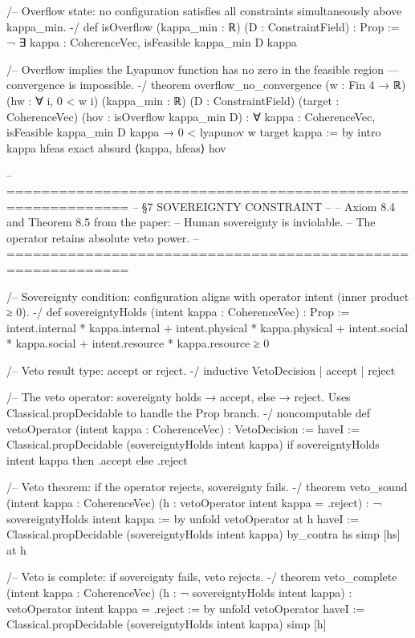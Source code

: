 /-- Overflow state: no configuration satisfies all constraints
    simultaneously above kappa_min. -/
def isOverflow (kappa_min : ℝ) (D : ConstraintField) : Prop :=
  ¬ ∃ kappa : CoherenceVec, isFeasible kappa_min D kappa

/-- Overflow implies the Lyapunov function has no zero
    in the feasible region — convergence is impossible. -/
theorem overflow_no_convergence (w : Fin 4 → ℝ) (hw : ∀ i, 0 < w i)
    (kappa_min : ℝ) (D : ConstraintField) (target : CoherenceVec)
    (hov : isOverflow kappa_min D) :
    ∀ kappa : CoherenceVec,
      isFeasible kappa_min D kappa →
      0 < lyapunov w target kappa := by
  intro kappa hfeas
  exact absurd ⟨kappa, hfeas⟩ hov

-- ============================================================
-- §7  SOVEREIGNTY CONSTRAINT
--
-- Axiom 8.4 and Theorem 8.5 from the paper:
-- Human sovereignty is inviolable.
-- The operator retains absolute veto power.
-- ============================================================

/-- Sovereignty condition: configuration aligns with operator
    intent (inner product ≥ 0). -/
def sovereigntyHolds (intent kappa : CoherenceVec) : Prop :=
  intent.internal * kappa.internal +
  intent.physical * kappa.physical +
  intent.social   * kappa.social   +
  intent.resource * kappa.resource ≥ 0

/-- Veto result type: accept or reject. -/
inductive VetoDecision | accept | reject

/-- The veto operator: sovereignty holds → accept, else → reject.
    Uses Classical.propDecidable to handle the Prop branch. -/
noncomputable def vetoOperator (intent kappa : CoherenceVec) : VetoDecision :=
  haveI := Classical.propDecidable (sovereigntyHolds intent kappa)
  if sovereigntyHolds intent kappa then .accept else .reject

/-- Veto theorem: if the operator rejects, sovereignty fails. -/
theorem veto_sound (intent kappa : CoherenceVec)
    (h : vetoOperator intent kappa = .reject) :
    ¬ sovereigntyHolds intent kappa := by
  unfold vetoOperator at h
  haveI := Classical.propDecidable (sovereigntyHolds intent kappa)
  by_contra hs
  simp [hs] at h

/-- Veto is complete: if sovereignty fails, veto rejects. -/
theorem veto_complete (intent kappa : CoherenceVec)
    (h : ¬ sovereigntyHolds intent kappa) :
    vetoOperator intent kappa = .reject := by
  unfold vetoOperator
  haveI := Classical.propDecidable (sovereigntyHolds intent kappa)
  simp [h]

